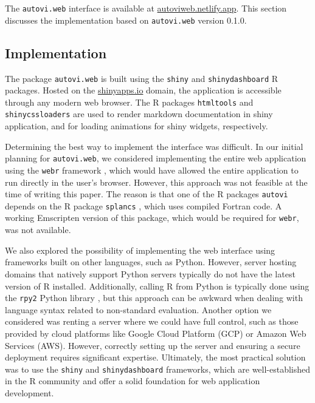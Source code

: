 \documentclass[
doublespace,
  times]{anzsauth}
\begin{document}
The \texttt{autovi.web} interface is available at
\url{autoviweb.netlify.app}. This section discusses the implementation
based on \texttt{autovi.web} version 0.1.0.

\subsection{Implementation}\label{implementation}

The package \texttt{autovi.web} is built using the \texttt{shiny}
\citep{shiny} and \texttt{shinydashboard} \citep{shinydashboard} R
packages. Hosted on the \href{https://www.shinyapps.io}{shinyapps.io}
domain, the application is accessible through any modern web browser.
The R packages \texttt{htmltools} \citep{htmltools} and
\texttt{shinycssloaders} \citep{shinycssloaders} are used to render
markdown documentation in shiny application, and for loading animations
for shiny widgets, respectively.

Determining the best way to implement the interface was difficult. In
our initial planning for \texttt{autovi.web}, we considered implementing
the entire web application using the \texttt{webr} framework
\citep{webr}, which would have allowed the entire application to run
directly in the user's browser. However, this approach was not feasible
at the time of writing this paper. The reason is that one of the R
packages \texttt{autovi} depends on the R package \texttt{splancs}
\citep{splancs}, which uses compiled Fortran code. A working Emscripten
\citep{zakai2011emscripten} version of this package, which would be
required for \texttt{webr}, was not available.

We also explored the possibility of implementing the web interface using
frameworks built on other languages, such as Python. However, server
hosting domains that natively support Python servers typically do not
have the latest version of R installed. Additionally, calling R from
Python is typically done using the \texttt{rpy2} Python library
\citep{rpy2}, but this approach can be awkward when dealing with
language syntax related to non-standard evaluation. Another option we
considered was renting a server where we could have full control, such
as those provided by cloud platforms like Google Cloud Platform (GCP) or
Amazon Web Services (AWS). However, correctly setting up the server and
ensuring a secure deployment requires significant expertise. Ultimately,
the most practical solution was to use the \texttt{shiny} and
\texttt{shinydashboard} frameworks, which are well-established in the R
community and offer a solid foundation for web application development.
\end{document}
